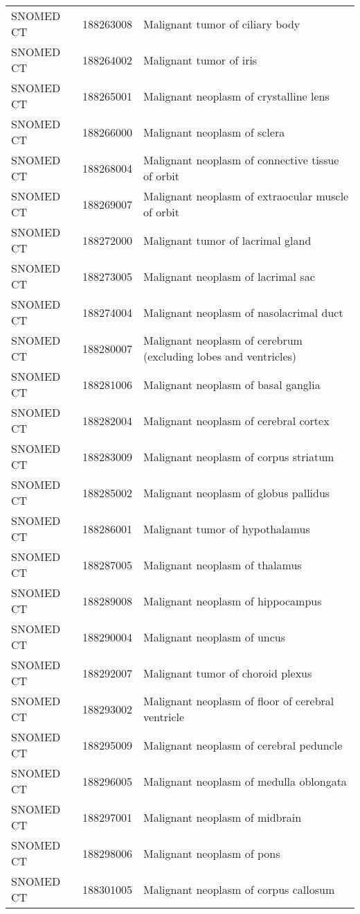 \begin{longtable}{p{}p{}p{}}
  SNOMED CT & 188263008 & Malignant tumor of ciliary body \\ 
  SNOMED CT & 188264002 & Malignant tumor of iris \\ 
  SNOMED CT & 188265001 & Malignant neoplasm of crystalline lens \\ 
  SNOMED CT & 188266000 & Malignant neoplasm of sclera \\ 
  SNOMED CT & 188268004 & Malignant neoplasm of connective tissue of orbit \\ 
  SNOMED CT & 188269007 & Malignant neoplasm of extraocular muscle of orbit \\ 
  SNOMED CT & 188272000 & Malignant tumor of lacrimal gland \\ 
  SNOMED CT & 188273005 & Malignant neoplasm of lacrimal sac \\ 
  SNOMED CT & 188274004 & Malignant neoplasm of nasolacrimal duct \\ 
  SNOMED CT & 188280007 & Malignant neoplasm of cerebrum (excluding lobes and ventricles) \\ 
  SNOMED CT & 188281006 & Malignant neoplasm of basal ganglia \\ 
  SNOMED CT & 188282004 & Malignant neoplasm of cerebral cortex \\ 
  SNOMED CT & 188283009 & Malignant neoplasm of corpus striatum \\ 
  SNOMED CT & 188285002 & Malignant neoplasm of globus pallidus \\ 
  SNOMED CT & 188286001 & Malignant tumor of hypothalamus \\ 
  SNOMED CT & 188287005 & Malignant neoplasm of thalamus \\ 
  SNOMED CT & 188289008 & Malignant neoplasm of hippocampus \\ 
  SNOMED CT & 188290004 & Malignant neoplasm of uncus \\ 
  SNOMED CT & 188292007 & Malignant tumor of choroid plexus \\ 
  SNOMED CT & 188293002 & Malignant neoplasm of floor of cerebral ventricle \\ 
  SNOMED CT & 188295009 & Malignant neoplasm of cerebral peduncle \\ 
  SNOMED CT & 188296005 & Malignant neoplasm of medulla oblongata \\ 
  SNOMED CT & 188297001 & Malignant neoplasm of midbrain \\ 
  SNOMED CT & 188298006 & Malignant neoplasm of pons \\ 
  SNOMED CT & 188301005 & Malignant neoplasm of corpus callosum \\ 

\end{longtable}
